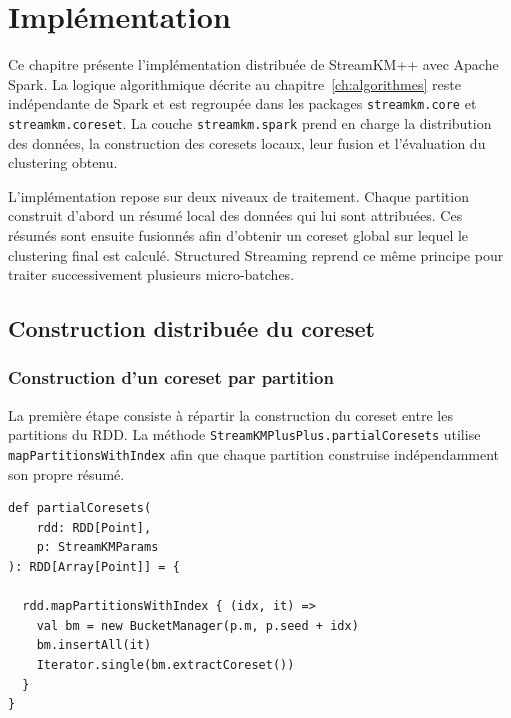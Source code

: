 
\chapter{Implémentation}
\label{ch:implementation}

Ce chapitre présente l'implémentation distribuée de StreamKM++ avec Apache Spark. La logique algorithmique décrite au chapitre~\ref{ch:algorithmes} reste indépendante de Spark et est regroupée dans les packages \texttt{streamkm.core} et \texttt{streamkm.coreset}. La couche \texttt{streamkm.spark} prend en charge la distribution des données, la construction des coresets locaux, leur fusion et l'évaluation du clustering obtenu.

L'implémentation repose sur deux niveaux de traitement. Chaque partition construit d'abord un résumé local des données qui lui sont attribuées. Ces résumés sont ensuite fusionnés afin d'obtenir un coreset global sur lequel le clustering final est calculé. Structured Streaming reprend ce même principe pour traiter successivement plusieurs micro-batches.

\section{Construction distribuée du coreset}
\label{sec:impl-dataflow}

\subsection{Construction d'un coreset par partition}

La première étape consiste à répartir la construction du coreset entre les partitions du RDD. La méthode \texttt{StreamKMPlusPlus.partialCoresets} utilise \texttt{mapPartitionsWithIndex} afin que chaque partition construise indépendamment son propre résumé.

\begin{verbatim}
def partialCoresets(
    rdd: RDD[Point],
    p: StreamKMParams
): RDD[Array[Point]] = {

  rdd.mapPartitionsWithIndex { (idx, it) =>
    val bm = new BucketManager(p.m, p.seed + idx)
    bm.insertAll(it)
    Iterator.single(bm.extractCoreset())
  }
}
\end{verbatim}

